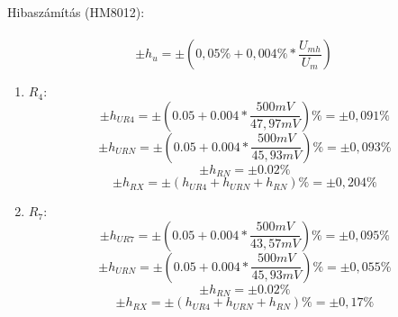 \documentclass[10pt,a4paper]{article}
\begin{document}
		Hibaszámítás (HM8012):\\\\
		$$\pm h_u = \pm \left(0,05\% + 0,004\% * \frac{U_{mh}}{U_m}\right)$$
		\begin{enumerate}
			\item $R_4$:
			$$\pm h_{UR4} = \pm \left(0.05 + 0.004*\frac{500 mV}{47,97 mV}\right) \% = \pm 0,091 \% $$
			$$\pm h_{URN} = \pm \left(0.05 + 0.004*\frac{500 mV}{45,93 mV}\right) \% = \pm 0,093 \% $$
			$$\pm h_{RN} = \pm 0.02 \%$$
			$$\pm h_{RX} = \pm \left(h_{UR4} + h_{URN} + h_{RN}\right) \% = \pm 0,204 \%$$
			\item $R_7$:
			$$\pm h_{UR7} = \pm \left(0.05 + 0.004*\frac{500 mV}{43,57 mV}\right) \% = \pm 0,095 \% $$
			$$\pm h_{URN} = \pm \left(0.05 + 0.004*\frac{500 mV}{45,93 mV}\right) \% = \pm 0,055 \% $$
			$$\pm h_{RN} = \pm 0.02 \%$$
			$$\pm h_{RX} = \pm \left(h_{UR4} + h_{URN} + h_{RN}\right) \% = \pm 0,17 \%$$
		\end{enumerate}
		
		
\end{document}
